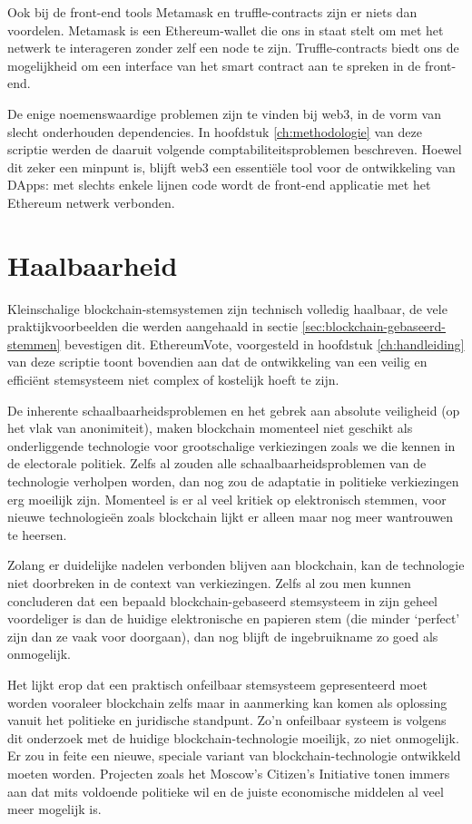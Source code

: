 Ook bij de front-end tools Metamask en truffle-contracts zijn er niets dan voordelen. Metamask is een Ethereum-wallet die ons in staat stelt om met het netwerk te interageren zonder zelf een node te zijn. Truffle-contracts biedt ons de mogelijkheid om een interface van het smart contract aan te spreken in de front-end. 

De enige noemenswaardige problemen zijn te vinden bij web3, in de vorm van slecht onderhouden dependencies. In hoofdstuk \ref{ch:methodologie} van deze scriptie werden de daaruit volgende comptabiliteitsproblemen beschreven. Hoewel dit zeker een minpunt is,  blijft web3 een essentiële tool voor de ontwikkeling van DApps: met slechts enkele lijnen code wordt  de front-end applicatie met het Ethereum netwerk verbonden.
\section{Haalbaarheid}
Kleinschalige blockchain-stemsystemen zijn technisch volledig haalbaar, de vele praktijkvoorbeelden die werden aangehaald in sectie \ref{sec:blockchain-gebaseerd-stemmen} bevestigen dit. EthereumVote, voorgesteld in hoofdstuk \ref{ch:handleiding} van deze scriptie toont bovendien aan dat de ontwikkeling van een veilig en efficiënt stemsysteem niet complex of kostelijk hoeft te zijn.
	
De inherente schaalbaarheidsproblemen en het gebrek aan absolute veiligheid (op het vlak van anonimiteit), maken blockchain momenteel niet geschikt als onderliggende technologie voor grootschalige verkiezingen zoals we die kennen in de electorale politiek. Zelfs al zouden alle schaalbaarheidsproblemen van de technologie verholpen worden, dan nog zou de adaptatie in politieke verkiezingen erg moeilijk zijn.  Momenteel is er al veel kritiek op elektronisch stemmen, voor nieuwe technologieën zoals blockchain lijkt er alleen maar nog meer wantrouwen te heersen. 
	
Zolang er duidelijke nadelen verbonden blijven aan blockchain, kan de technologie niet doorbreken in de context van verkiezingen.  Zelfs al zou men kunnen concluderen dat een bepaald blockchain-gebaseerd stemsysteem in zijn geheel voordeliger is dan de huidige elektronische en papieren stem (die minder `perfect' zijn dan ze vaak voor doorgaan), dan nog blijft de ingebruikname zo goed als onmogelijk.
	
Het lijkt erop dat een praktisch onfeilbaar stemsysteem gepresenteerd moet worden vooraleer blockchain zelfs maar in aanmerking kan komen als oplossing vanuit het politieke en juridische standpunt. Zo'n onfeilbaar systeem is volgens dit onderzoek met de huidige blockchain-technologie moeilijk, zo niet onmogelijk.  Er zou in feite een nieuwe, speciale variant van blockchain-technologie ontwikkeld moeten worden. Projecten zoals het Moscow's Citizen's Initiative tonen immers aan dat mits voldoende politieke wil en de juiste economische middelen al veel meer mogelijk is. 
	
